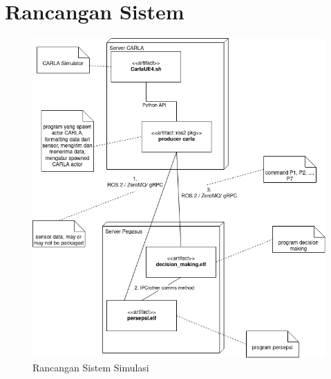\chapter{Rancangan Sistem}\label{appendix-arsitektur-baru}
\setcounter{section}{1}
\begin{figure}[ht]
	\centering
	\includegraphics[width=1.0\textwidth]{resources/appendix-1-deployment diagram.png}
	\caption{Rancangan Sistem Simulasi}
\end{figure}
